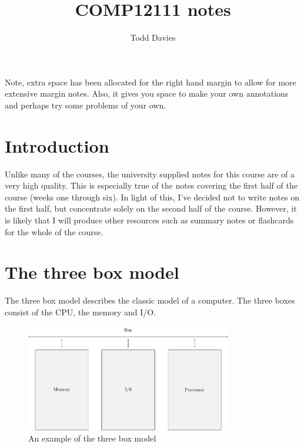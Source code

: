 \documentclass{article}
\begin{document}
\author{Todd Davies}
\title{COMP12111 notes}
\chead{}

\maketitle

{\small Note, extra space has been allocated for the right hand margin to allow
for more extensive margin notes. Also, it gives you space to make your own
annotations and perhaps try some problems of your own.}

\tableofcontents
\newpage

\section*{Introduction}

Unlike many of the courses, the university supplied notes for this course are of
a very high quality. This is especially true of the notes covering the first
half of the course (weeks one through six). In light of this, I've decided not
to write notes on the first half, but concentrate solely on the second half of
the course. However, it is likely that I will produce other resources such as
summary notes or flashcards for the whole of the course.

\section{The three box model}

The three box model describes the classic model of a computer. The three boxes
consist of the CPU, the memory and I/O.

\begin{figure}[ht!]
	\centering
	\includegraphics[width=90mm]{three_box_model.pdf}
	\caption{An example of the three box model}
	\label{overflow}
\end{figure}
\end{document}
